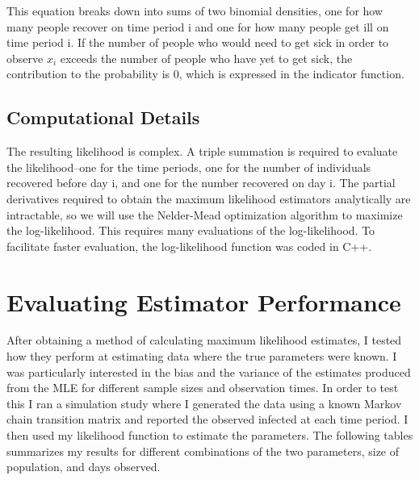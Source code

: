 \documentclass{svproc}
\begin{document}
This equation breaks down into sums of two binomial densities, one for how many people recover on time period i and one for how many people get ill on time period i. If the number of people who would need to get sick in order to observe $x_i$ exceeds the number of people who have yet to get sick, the contribution to the probability is 0, which is expressed in the indicator function.

\subsection*{Computational Details}
The resulting likelihood is complex. A triple summation is required to evaluate the likelihood--one for the time periods, one for the number of individuals recovered before day i, and one for the number recovered on day i. The partial derivatives required to obtain the maximum likelihood estimators analytically are intractable, so we will use the Nelder-Mead optimization algorithm to maximize the log-likelihood. This requires many evaluations of the log-likelihood. To facilitate faster evaluation, the log-likelihood function was coded in C++.

\section{Evaluating Estimator Performance}
After obtaining a method of calculating maximum likelihood estimates, I tested how they perform at estimating data where the true parameters were known. I was particularly interested in the bias and the variance of the estimates produced from the MLE for different sample sizes and observation times. In order to test this I ran a simulation study where I generated the data using a known Markov chain transition matrix and reported the observed infected at each time period. I then used my likelihood function to estimate the parameters. The following tables summarizes my results for different combinations of the two parameters, size of population, and days observed.
\end{document}

